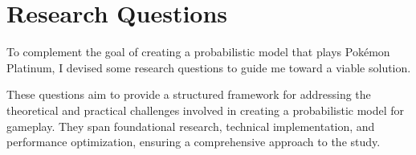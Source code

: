 \chapter{Research Questions}

To complement the goal of creating a probabilistic model that plays Pokémon Platinum, I devised some research questions to guide me toward a viable solution.

These questions aim to provide a structured framework for addressing the theoretical and practical challenges involved in creating a probabilistic model for gameplay. They span foundational research, technical implementation, and performance optimization, ensuring a comprehensive approach to the study.

\newpage


\newpage


\newpage
